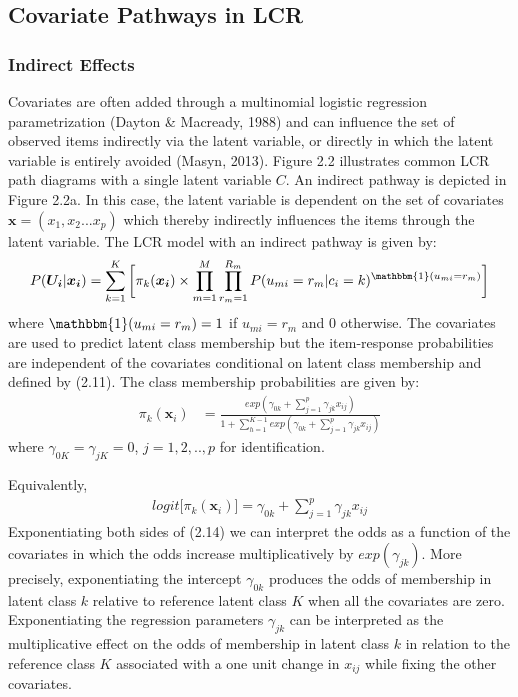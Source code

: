 \vspace{-1em}

\subsection{Covariate Pathways in LCR}

\subsubsection{Indirect Effects}
Covariates are often added through a multinomial logistic regression parametrization (Dayton \& Macready, 1988) and can influence the set of observed items indirectly via the latent variable, or directly in which the latent variable is entirely avoided (Masyn, 2013). Figure 2.2 illustrates  common LCR path diagrams with a single latent variable $C$. An indirect pathway is depicted in Figure 2.2a. In this case, the latent variable is dependent on the set of covariates $\bm{x}=(x_{1},x_{2}...x_{p})$ which thereby indirectly influences the items through the latent variable. The LCR model with an indirect pathway is given by:
\begin{align}
P(\bm{U_{i}}|\bm{x_{i}}) = \sum_{k=1}^{K} \bigg[ \pi_{k}(\bm{x_{i}}) \times  \prod_{m=1}^{M}\prod_{r_{m}=1}^{R_{m}} P(u_{mi}=r_{m}|c_{i}=k)^{\mathbbm{1}(u_{mi} = r_{m})} \bigg ]
\end{align}
where $\mathbbm{1}(u_{mi} = r_{m})=1$ if $u_{mi}=r_{m}$ and $0$ otherwise. The covariates are used to predict latent class membership but the item-response probabilities are independent of the covariates conditional on latent class membership and defined by (2.11). 
The class membership probabilities are given by:
\begin{align}
    \pi_{k}(\bm{x}_{i}) &=  \frac{exp(\gamma_{0k} + \sum_{j=1}^{p}\gamma_{jk}x_{ij})}
    {1 + \sum_{h=1}^{K-1}exp(\gamma_{0k} + \sum_{j=1}^{p} \gamma_{jk}x_{ij})}
\end{align} where $\gamma_{0K}=\gamma_{jK}=0$, $j=1,2,..,p$ for identification. 

\hspace{-1.7em} Equivalently,
\begin{align}
    logit\big[\pi_{k}(\bm{x}_{i})\big] = \gamma_{0k} + \sum_{j=1}^{p}\gamma_{jk}x_{ij}
\end{align} Exponentiating both sides of (2.14) we can interpret the odds as a function of the covariates in which the odds increase multiplicatively by $exp(\gamma_{jk})$. More precisely, exponentiating the intercept $\gamma_{0k}$ produces the odds of membership in latent class $k$ relative to reference latent class $K$ when all the covariates are zero. Exponentiating the regression parameters $\gamma_{jk}$ can be interpreted as the multiplicative effect on the odds of membership in latent class $k$ in relation to the reference class $K$ associated with a one unit change in $x_{ij}$ while fixing the other covariates. 

